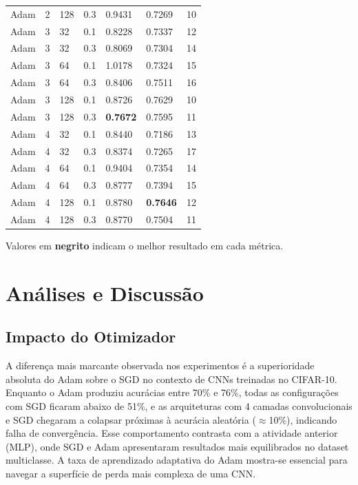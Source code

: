 \documentclass[12pt,a4paper]{article}
\begin{document}
\begin{table}[H]
\begin{tabular}{lllllll}
Adam & 2 & 128 & 0.3 & 0.9431 & 0.7269 & 10 \\
Adam & 3 & 32  & 0.1 & 0.8228 & 0.7337 & 12 \\
Adam & 3 & 32  & 0.3 & 0.8069 & 0.7304 & 14 \\
Adam & 3 & 64  & 0.1 & 1.0178 & 0.7324 & 15 \\
Adam & 3 & 64  & 0.3 & 0.8406 & 0.7511 & 16 \\
Adam & 3 & 128 & 0.1 & 0.8726 & 0.7629 & 10 \\
Adam & 3 & 128 & 0.3 & \textbf{0.7672} & 0.7595 & 11 \\
Adam & 4 & 32  & 0.1 & 0.8440 & 0.7186 & 13 \\
Adam & 4 & 32  & 0.3 & 0.8374 & 0.7265 & 17 \\
Adam & 4 & 64  & 0.1 & 0.9404 & 0.7354 & 14 \\
Adam & 4 & 64  & 0.3 & 0.8777 & 0.7394 & 15 \\
Adam & 4 & 128 & 0.1 & 0.8780 & \textbf{0.7646} & 12 \\
Adam & 4 & 128 & 0.3 & 0.8770 & 0.7504 & 11 \\
\bottomrule
\end{tabular}
\begin{tablenotes}
  \footnotesize
  \item Valores em \textbf{negrito} indicam o melhor resultado em cada métrica.
\end{tablenotes}
\end{table}

\section{Análises e Discussão}

\subsection{Impacto do Otimizador}

A diferença mais marcante observada nos experimentos é a superioridade absoluta do Adam sobre o SGD no contexto de CNNs treinadas no CIFAR-10. Enquanto o Adam produziu acurácias entre 70\% e 76\%, todas as configurações com SGD ficaram abaixo de 51\%, e as arquiteturas com 4 camadas convolucionais e SGD chegaram a colapsar próximas à acurácia aleatória ($\approx$10\%), indicando falha de convergência. Esse comportamento contrasta com a atividade anterior (MLP), onde SGD e Adam apresentaram resultados mais equilibrados no dataset multiclasse. A taxa de aprendizado adaptativa do Adam mostra-se essencial para navegar a superfície de perda mais complexa de uma CNN.
\end{document}
